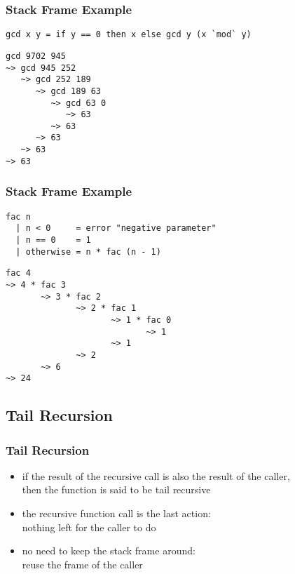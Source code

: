 \documentclass[dvipsnames]{beamer}
\theoremstyle{plain}
\begin{document}
\begin{frame}[fragile]
  \frametitle{Stack Frame Example}

  \begin{exampleblock}{}
    \begin{lstlisting}
gcd x y = if y == 0 then x else gcd y (x `mod` y)
    \end{lstlisting}

    \begin{lstlisting}[frame=single]
gcd 9702 945
~> gcd 945 252
   ~> gcd 252 189
      ~> gcd 189 63
         ~> gcd 63 0
            ~> 63
         ~> 63
      ~> 63
   ~> 63
~> 63
    \end{lstlisting}
  \end{exampleblock}
\end{frame}

\begin{frame}[fragile]
  \frametitle{Stack Frame Example}

  \begin{exampleblock}{}
    \begin{lstlisting}
fac n
  | n < 0     = error "negative parameter"
  | n == 0    = 1
  | otherwise = n * fac (n - 1)
    \end{lstlisting}

    \begin{lstlisting}[frame=single]
fac 4
~> 4 * fac 3
       ~> 3 * fac 2
              ~> 2 * fac 1
                     ~> 1 * fac 0
                            ~> 1
                     ~> 1
              ~> 2
       ~> 6
~> 24
    \end{lstlisting}
  \end{exampleblock}
\end{frame}

\subsection{Tail Recursion}

\begin{frame}
  \frametitle{Tail Recursion}

  \begin{itemize}
    \item if the result of the recursive call is also the result of the caller,\\
      then the function is said to be \alert{tail recursive}
    \item the recursive function call is the last action:\\
      nothing left for the caller to do

    \pause
    \medskip
    \item no need to keep the stack frame around:\\
      reuse the frame of the caller
  \end{itemize}
\end{frame}
\end{document}
